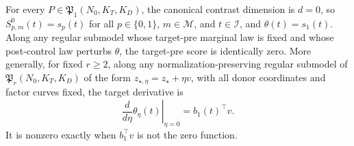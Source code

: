 For every \(P\in\mathfrak P_1(N_0,K_T,K_D)\), the canonical contrast dimension is \(d=0\), so \(S^0_{p,m}(t)=s_p(t)\) for all \(p\in\{0,1\}\), \(m\in\mathcal M\), and \(t\in\mathcal I\), and \(\theta(t)=s_1(t)\). Along any regular submodel whose target-pre marginal law is fixed and whose post-control law perturbs \(\theta\), the target-pre score is identically zero. More generally, for fixed \(r\ge2\), along any normalization-preserving regular submodel of \(\mathfrak P_r(N_0,K_T,K_D)\) of the form \(z_{\star,\eta}=z_\star+\eta v\), with all donor coordinates and factor curves fixed, the target derivative is
\[
 \left.\frac{d}{d\eta}\theta_\eta(t)\right|_{\eta=0}=b_1(t)^\top v.
\]
It is nonzero exactly when \(b_1^\top v\) is not the zero function.